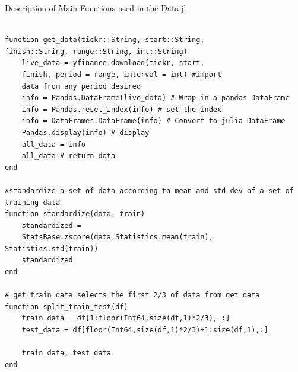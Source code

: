 \begin{listing}[h]
\caption{Description of Main Functions used in the Data.jl}
\label{lst: Data.jl}
\begin{verbatim}
              
function get_data(tickr::String, start::String,
finish::String, range::String, int::String)
    live_data = yfinance.download(tickr, start,
    finish, period = range, interval = int) #import
    data from any period desired
    info = Pandas.DataFrame(live_data) # Wrap in a pandas DataFrame
    info = Pandas.reset_index(info) # set the index 
    info = DataFrames.DataFrame(info) # Convert to julia DataFrame
    Pandas.display(info) # display
    all_data = info
    all_data # return data
end

#standardize a set of data according to mean and std dev of a set of training data
function standardize(data, train) 
    standardized =
    StatsBase.zscore(data,Statistics.mean(train), Statistics.std(train))
    standardized
end

# get_train_data selects the first 2/3 of data from get_data
function split_train_test(df)
    train_data = df[1:floor(Int64,size(df,1)*2/3), :]
    test_data = df[floor(Int64,size(df,1)*2/3)+1:size(df,1),:]
    
    train_data, test_data
end

\end{verbatim}
\end{listing}



